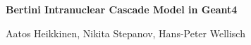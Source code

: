 
\def \PIC {pictures}


\vspace{5.5truecm}

\begin{center}
  \Large {\bf Bertini Intranuclear Cascade Model in {\sc Geant4} }
  \normalsize
  
  \vspace{1.5truecm} Aatos Heikkinen, Nikita Stepanov, Hans-Peter Wellisch
\end{center}
\thispagestyle{empty} \newpage

\tableofcontents
\newpage

  

 
 
%




\begin{appendix} 
%
\end{appendix} 


